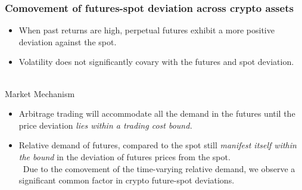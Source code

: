 \documentclass{beamer}
\begin{document}
\begin{frame}
\frametitle{Comovement of futures-spot deviation across crypto assets}
\begin{itemize}
    \item When past returns are high, perpetual futures exhibit a more positive deviation against the spot.
    \item Volatility does not significantly covary with the futures and spot deviation.
\end{itemize}
~\\Market Mechanism
\begin{itemize}
    \item \alert{Arbitrage trading} will accommodate all the demand in the futures until the price deviation \textit{lies within a trading cost bound.}
    \item \alert{Relative demand of futures}, compared to the spot still \textit{manifest itself within the bound} in the deviation of futures prices from the spot.\\~Due to the comovement of the time-varying relative demand, we observe a significant common factor in crypto future-spot deviations.
\end{itemize} 
\end{frame}
\end{document}
